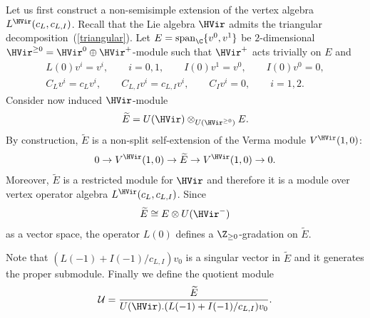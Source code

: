 Let us f\/irst construct a non-semisimple extension of the vertex algebra $L^{\HVir} (c_L, c_{L,I})$. Recall that the Lie algebra $\HVir$ admits the triangular decomposition~(\ref{triangular}). Let $E=\operatorname{span}_{\C} \{ v^{0}, v^{1} \}$ be $2$-dimensional $\HVir^{\ge 0} = \HVir^{0} \oplus \HVir^{+}$-module such that $\HVir ^+ $ acts trivially on $E$ and
\begin{gather*}
L(0) v^{i} = v^{i} , \qquad i=0,1, \qquad I(0) v^1 = v^0, \qquad I(0) v^0 = 0, \\
C_L v^{i} = c_L v^{i}, \qquad C_{L,I} v^{i} = c_{L,I} v^{i}, \qquad C_I v^{i} = 0, \qquad i=1,2.
\end{gather*}
Consider now induced $\HVir$-module
\begin{gather*}
\widetilde E = U(\HVir) \otimes _{U (\HVir ^{\ge 0} )} E.
\end{gather*}
By construction, $\widetilde E$ is a non-split self-extension of the Verma module $V^{\HVir} (1,0)$:
\begin{gather*}
0 \rightarrow V^{\HVir} (1,0) \rightarrow \widetilde E \rightarrow V^{\HVir} (1,0 ) \rightarrow 0.
\end{gather*}
Moreover, $\widetilde E$ is a restricted module for $\HVir$ and therefore it is a module over vertex operator algebra $L^{\HVir} (c_L, c_{L,I})$. Since
\begin{gather*}
\widetilde E \cong E \otimes U(\HVir^{-})
\end{gather*}
as a vector space, the operator $L(0)$ def\/ines a $\Z_{\ge 0}$-gradation on $\widetilde E$.

Note that $ (L(-1) + I(-1) / c_{L,I} ) v_0$ is a singular vector in $\widetilde E$ and it generates the proper submodule. Finally we def\/ine the quotient module
\begin{gather*}
\mathcal U = \frac{ \widetilde E} {U(\HVir) . (L(-1) + I(-1) / c_{L,I} ) v_0}.
\end{gather*}

